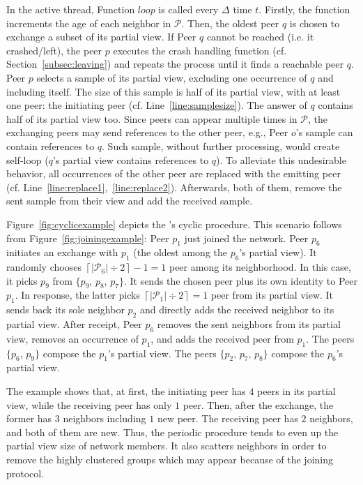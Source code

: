 In the active thread, Function $loop$ is called every $\Delta$ time
$t$. Firstly, the function increments the age of each neighbor in
$\mathcal{P}$. Then, the oldest peer $q$ is chosen to exchange a subset of its
partial view. If Peer $q$ cannot be reached (i.e. it crashed/left), the peer
$p$ executes the crash handling function (cf. Section~\ref{subsec:leaving}) and
repeats the process until it finds a reachable peer $q$. Peer $p$ selects a
sample of its partial view, excluding one occurrence of $q$ and including
itself. The size of this sample is half of its partial view, with at least one
peer: the initiating peer (cf. Line~\ref{line:samplesize}). The answer of $q$
contains half of its partial view too. Since peers can appear multiple times in
$\mathcal{P}$, the exchanging peers may send references to the other peer,
e.g., Peer $o$'s sample can contain references to $q$. Such sample, without
further processing, would create self-loop ($q$'s partial view contains
references to $q$). To alleviate this undesirable behavior, all occurrences of
the other peer are replaced with the emitting peer
(cf. Line~\ref{line:replace1},~\ref{line:replace2}).  Afterwards, both of them,
remove the sent sample from their view and add the received sample.

Figure~\ref{fig:cyclicexample} depicts the \SPRAY's cyclic
procedure. This scenario follows from Figure~\ref{fig:joiningexample}:
Peer $p_1$ just joined the network. Peer $p_6$ initiates an exchange
with $p_1$ (the oldest among the $p_6$'s partial view). It randomly
chooses $\left\lceil{|\mathcal{P}_6|\div 2}\right\rceil-1 = 1$ peer
among its neighborhood. In this case, it picks $p_9$ from
$\{p_9,\,p_8,\,p_7\}$.  It sends the chosen peer plus its own identity
to Peer $p_1$. In response, the latter picks
$\left\lceil{|\mathcal{P}_1|\div 2}\right\rceil = 1$ peer from its
partial view. It sends back its sole neighbor $p_2$ and directly adds
the received neighbor to its partial view. After receipt, Peer $p_6$
removes the sent neighbors from its partial view, removes an
occurrence of $p_1$, and adds the received peer from $p_1$. The peers
$\{p_6,\,p_9\}$ compose the $p_1$'s partial view. The peers
$\{p_2,\,p_7,\,p_8\}$ compose the $p_6$'s partial view.

The example shows that, at first, the initiating peer has $4$ peers in
its partial view, while the receiving peer has only $1$ peer. Then,
after the exchange, the former has $3$ neighbors including $1$ new
peer. The receiving peer has $2$ neighbors, and both of them are
new. Thus, the periodic procedure tends to even up the partial view
size of network members. It also scatters neighbors in order to remove
the highly clustered groups which may appear because of the joining
protocol.

